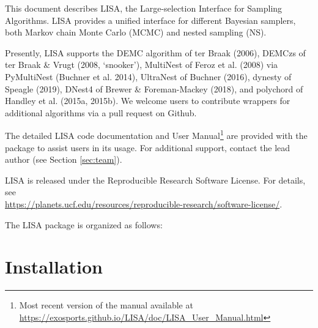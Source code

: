 \documentclass[letterpaper, 12pt]{article}
\begin{document}
\noindent This document describes LISA, the Large-selection Interface for 
Sampling Algorithms.  LISA provides a unified interface for different 
Bayesian samplers, both Markov chain Monte Carlo (MCMC) and nested sampling 
(NS).  \newline

\noindent Presently, LISA supports the 
DEMC algorithm of ter Braak (2006), 
DEMCzs of ter Braak \& Vrugt (2008, `snooker'), 
MultiNest of Feroz et al. (2008) via PyMultiNest (Buchner et al. 2014), 
UltraNest of Buchner (2016), 
dynesty of Speagle (2019), 
DNest4 of Brewer \& Foreman-Mackey (2018), and 
polychord of Handley et al. (2015a, 2015b).  
We welcome users to contribute wrappers for additional 
algorithms via a pull request on Github. \newline

\noindent The detailed LISA code documentation and User Manual\footnote{Most recent version of the manual available at 
\href{https://exosports.github.io/LISA/doc/LISA_User_Manual.html}{https://exosports.github.io/LISA/doc/LISA\_User\_Manual.html}} 
are provided with the package to assist users in its usage. 
For additional support, contact the lead author (see Section \ref{sec:team}). \newline

\noindent LISA is released under the Reproducible Research Software License.  
For details, see \\
\href{https://planets.ucf.edu/resources/reproducible-research/software-license/}{https://planets.ucf.edu/resources/reproducible-research/software-license/}.\newline

\noindent The LISA package is organized as follows: \newline
\noindent{}
\vspace{0.7cm}

\section{Installation}
\label{sec:installation}
\end{document}
